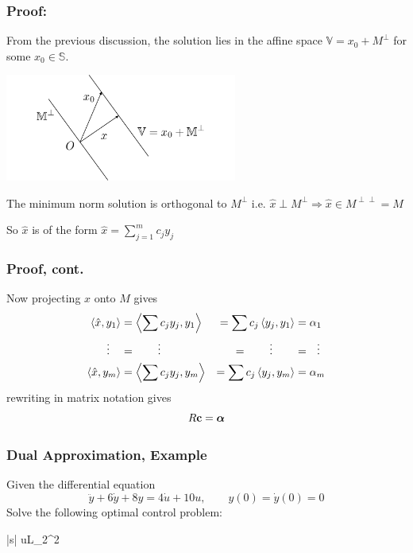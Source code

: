 \documentclass{beamer}
\begin{document}
\begin{frame}\frametitle{Proof:}
	From the previous discussion, the solution lies in the affine space  $\mathbb{V} = x_0 + M^{\perp}$ for some $x_0 \in \mathbb{S}$.
	\begin{center}
	\includegraphics[width=3in]{figures/chap3_dual_approximation}
	\end{center}

	\vfill
	
	The minimum norm solution is orthogonal to $M^{\perp}$ i.e. $\hat{x} \perp
	M^{\perp} \Rightarrow \hat{x} \in M^{\perp \perp} = M$

	\vfill
	
	So $\hat{x}$ is of the form $\hat{x} = \displaystyle \sum_{j=1}^{m}c_jy_j$
\end{frame}

\begin{frame}\frametitle{Proof, cont.}
	Now projecting $x$ onto $M$ gives
	\begin{align*}
	\left< \hat{x},y_1\right> &= \left< \sum c_jy_j, y_1\right> &= \sum c_j
	\left< y_j, y_1\right> &= \alpha_1 \\
	\vdots\quad &= \qquad\vdots\qquad &= \qquad\vdots\qquad &= ~~\vdots\\
	\left< \hat{x},y_m\right> &= \left< \sum c_j y_j, y_m\right> &= \sum c_j
	\left< y_j,y_m\right> &= \alpha_m
	\end{align*}
	rewriting in matrix notation gives
	\[ R\mathbf{c} = \boldsymbol{\alpha} \]	
\end{frame}


\begin{frame}\frametitle{Dual Approximation, Example}
	Given the differential equation
	\[ 
	\ddot{y} + 6\dot{y} + 8y = 4\dot{u} + 10u, \qquad y(0)=\dot{y}(0) =0 
	\]
	Solve the following optimal control problem:
		\begin{mini*}|s|
		{u\in L_2}{^2}{}{}
		\end{mini*}
\end{frame}
\end{document}
